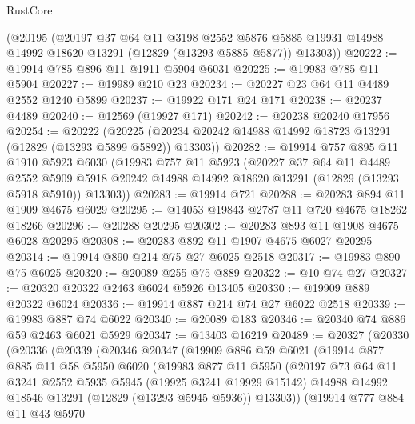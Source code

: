 \begin{lexlean}{RustCore}
\begin{coremodule}
    (@20195
      (@20197
        @37
        @64
        @11
        @3198
        @2552
        @5876
        @5885
        @19931
        @14988
        @14992
        @18620
        @13291
        (@12829 (@13293 @5885 @5877))
        @13303))
@20222 := @19914 @785 @896 @11 @1911 @5904 @6031
@20225 := @19983 @785 @11 @5904
@20227 := @19989 @210 @23
@20234 := @20227 @23 @64 @11 @4489 @2552 @1240 @5899
@20237 := @19922 @171 @24 @171
@20238 := @20237 @4489
@20240 := @12569 (@19927 @171)
@20242 := @20238 @20240 @17956
@20254 := @20222
    (@20225 (@20234 @20242 @14988 @14992 @18723 @13291 (@12829 (@13293 @5899 @5892)) @13303))
@20282 := @19914
    @757
    @895
    @11
    @1910
    @5923
    @6030
    (@19983
      @757
      @11
      @5923
      (@20227
        @37
        @64
        @11
        @4489
        @2552
        @5909
        @5918
        @20242
        @14988
        @14992
        @18620
        @13291
        (@12829 (@13293 @5918 @5910))
        @13303))
@20283 := @19914 @721
@20288 := @20283 @894 @11 @1909 @4675 @6029
@20295 := @14053 @19843 @2787 @11 @720 @4675 @18262 @18266
@20296 := @20288 @20295
@20302 := @20283 @893 @11 @1908 @4675 @6028 @20295
@20308 := @20283 @892 @11 @1907 @4675 @6027 @20295
@20314 := @19914 @890 @214 @75 @27 @6025 @2518
@20317 := @19983 @890 @75 @6025
@20320 := @20089 @255 @75 @889
@20322 := @10 @74 @27
@20327 := @20320 @20322 @2463 @6024 @5926 @13405
@20330 := @19909 @889 @20322 @6024
@20336 := @19914 @887 @214 @74 @27 @6022 @2518
@20339 := @19983 @887 @74 @6022
@20340 := @20089 @183
@20346 := @20340 @74 @886 @59 @2463 @6021 @5929
@20347 := @13403 @16219
@20489 := @20327
    (@20330
      (@20336
        (@20339
          (@20346
            @20347
            (@19909
              @886
              @59
              @6021
              (@19914
                @877
                @885
                @11
                @58
                @5950
                @6020
                (@19983
                  @877
                  @11
                  @5950
                  (@20197
                    @73
                    @64
                    @11
                    @3241
                    @2552
                    @5935
                    @5945
                    (@19925 @3241 @19929 @15142)
                    @14988
                    @14992
                    @18546
                    @13291
                    (@12829 (@13293 @5945 @5936))
                    @13303))
                (@19914
                  @777
                  @884
                  @11
                  @43
                  @5970

\end{coremodule}
\end{lexlean}
